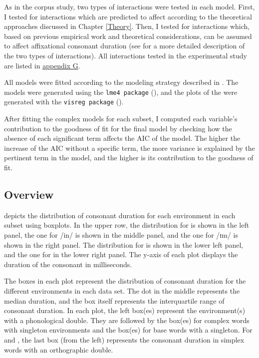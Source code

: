 As in the corpus study, two types of interactions were tested in each model. First, I tested for interactions which are predicted to affect  according to the theoretical approaches discussed in Chapter \ref{Theory}. Then, I tested for interactions which, based on previous empirical work and theoretical considerations, can be assumed to affect affixational consonant duration  (see  for a more detailed description of the two types of interactions). 
 All interactions tested in the experimental study are listed in \hyperref[Appendix G Summaries of tested interactions in experimental study]{appendix G}.

All models were fitted according to the modeling strategy described in .  
The models were generated using the \texttt{lme4 package} (\citealt{Bates.2014}), and the plots of the  were generated with the \texttt{visreg package} (\citealt{Breheny.2015}). 

After fitting the complex models for each subset, I computed each variable's contribution to the goodness of fit for the final model by checking how the absence of each significant term affects the AIC of the model. The higher the increase of the AIC without a specific term, the more variance is explained by the pertinent term in the model, and the higher is its contribution to the goodness of fit.







\subsection{Overview}
	
 depicts the distribution of consonant duration for each environment in each subset using boxplots. In the upper row, the distribution for  is shown in the left panel, the one for /in/
is shown in the middle panel, and the one for /ɪm/  is shown in the right panel. The distribution for  is shown in the lower left panel, and the one for  in the lower right panel.
The y-axis of each plot displays the duration of the consonant in milliseconds. 

The boxes in each plot represent the distribution of consonant duration for the different environments in each data set. The dot in the middle represents the median duration, and the box itself represents the interquartile range of consonant duration. 
In each plot, the left box(es) represent the environment(s) with a phonological double. They are followed by the box(es) for  complex words with singleton environments and the box(es) for base words with a singleton. For  and , the last box (from the left) represents the consonant duration in simplex words with an orthographic double.




